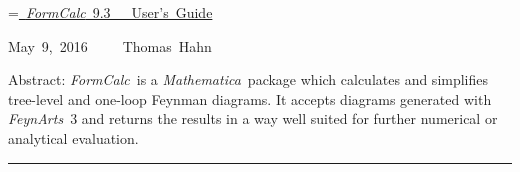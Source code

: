 \documentclass[twoside,11pt]{article}
\def\FA{\textit{FeynArts}}
\def\FC{\textit{FormCalc}}
\def\mma{\textit{Mathematica}}
\begin{document}
\thispagestyle{empty}

\vspace*{.7\textheight}

\newbox\titlebox\setbox\titlebox=\hbox{\underline{%
\vrule width 0pt height 0pt depth 2ex%
\Huge \FC~9.3~~~User's Guide}}

\hfill\copy\titlebox

\vspace*{1ex}

\hfill\hbox{May 9, 2016~~~~~Thomas Hahn}

\bigskip
\bigskip

\hfill\parbox{\wd\titlebox}{%
\begin{small}
Abstract:
\FC\ is a \mma\ package which calculates and simplifies tree-level and
one-loop Feynman diagrams.  It accepts diagrams generated with \FA\ 3
and returns the results in a way well suited for further numerical or
analytical evaluation.
\end{small}}

\clearpage

\vspace*{.5\textheight}
\vfill

\hrule

\medskip
\end{document}
